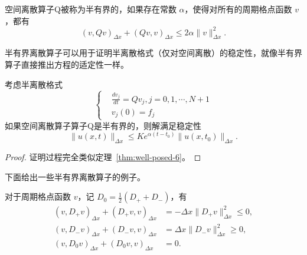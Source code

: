 \begin{definition}
    空间离散算子Q被称为半有界的，如果存在常数 $\alpha$，使得对所有的周期格点函数 $v$，都有
    \[
        (v,Q v)_{\Delta x} + (Q v,v)_{\Delta x} \le 2 \alpha \| v \|_{\Delta x}^2.
    \]
\end{definition}

半有界离散算子可以用于证明半离散格式（仅对空间离散）的稳定性，就像半有界算子直接推出方程的适定性一样。
\begin{theorem}
    考虑半离散格式
    \[
        \left\{
        \begin{aligned}
             & \frac{d v_j}{d t} = Q v_j, j=0,1,\cdots,N+1 \\
             & v_j(0) = f_j
        \end{aligned}
        \right.
    \]
    如果空间离散算子算子Q是半有界的，则解满足稳定性
    \[
        \| u(x,t) \|_{\Delta x} \le
        K e^{\alpha(t-t_0)} \| u(x,t_0) \|_{\Delta x}.
    \]
\end{theorem}

\begin{proof}
    证明过程完全类似定理~\ref{thm:well-posed-6}。
\end{proof}

下面给出一些半有界离散算子的例子。

\begin{lemma}
    对于周期格点函数 $v$，记 $D_0=\frac12(D_++D_-)$，有
    \begin{align*}
        (v,D_+v)_{\Delta x} + (D_+v,v)_{\Delta x}
         & = -\Delta x\|D_+v\|_{\Delta x}^2 \le 0,
        \\
        (v,D_-v)_{\Delta x} + (D_-v,v)_{\Delta x}
         & = \Delta x\|D_-v\|_{\Delta x}^2 \ge 0,
        \\
        (v,D_0v)_{\Delta x} + (D_0v,v)_{\Delta x}
         & = 0.
    \end{align*}
\end{lemma}

